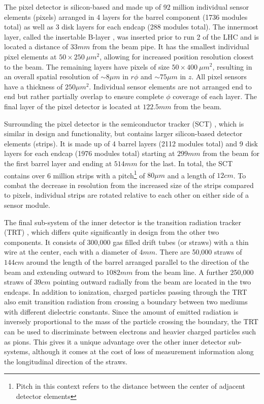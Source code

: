 The pixel detector \cite{pernegger-pixel-detector} is silicon-based and made up of 92 million individual sensor 
elements (pixels) arranged in 4 layers for the barrel component (1736 modules total) as well as 3 disk layers for each 
endcap (288 modules total). The innermost layer, called the insertable B-layer \cite{atlas-insertable-b-layer}, was 
inserted prior to run 2 of the LHC and is located a distance of $33mm$ from the beam pipe. It has the smallest individual 
pixel elements at $50\times250\ \mu m^2$, allowing for increased position resolution closest to the beam. The remaining 
layers have pixels of size $50\times400\ \mu m^2$, resulting in an overall spatial resolution of $\sim 8 \mu m$ in 
$r\phi$ and $\sim 75 \mu m$ in $z$. All pixel sensors have a thickness of $250 \mu m^2$. Individual sensor elements 
are not arranged end to end but rather partially overlap to ensure complete $\phi$ coverage of each layer. The final 
layer of the pixel detector is located at $122.5mm$ from the beam. \par

Surrounding the pixel detector is the semiconductor tracker (SCT) \cite{atlas-sct}, which is similar in design and 
functionality, but contains larger silicon-based detector elements (strips). It is made up of 4 barrel layers (2112 
modules total) and 9 disk layers for each endcap (1976 modules total) starting at $299mm$ from the beam for the first 
barrel layer and ending at $514mm$ for the last. In total, the SCT contains over 6 million strips with a 
pitch\footnote{Pitch in this context refers to the distance between the center of adjacent detector elements} of 
$80\mu m$ and a length of $12cm$. To combat the decrease in resolution from the increased size of the strips compared 
to pixels, individual strips are rotated relative to each other on either side of a sensor module. \par

The final sub-system of the inner detector is the transition radiation tracker (TRT) \cite{atlas-trt}, which differs 
quite significantly in design from the other two components. It consists of 300,000 gas filled drift tubes (or straws) 
with a thin wire at the center, each with a diameter of $4mm$. There are 50,000 straws of $144cm$ around the length of 
the barrel arranged parallel to the direction of the beam and extending outward to $1082mm$ from the beam line. A 
further 250,000 straws of $39cm$ pointing outward radially from the beam are located in the two endcaps. In addition to 
ionization, charged particles passing through the TRT also emit transition radiation from crossing a boundary between 
two mediums with different dielectric constants. Since the amount of emitted radiation is inversely proportional to the 
mass of the particle crossing the boundary, the TRT can be used to discriminate between electrons and heavier charged 
particles such as pions. This gives it a unique advantage over the other inner detector sub-systems, although it comes 
at the cost of loss of measurement information along the longitudinal direction of the straws. \par

